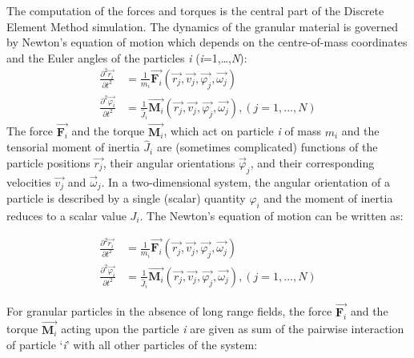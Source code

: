 The computation of the forces and torques is the central part of the Discrete 
Element Method 
simulation. 
The dynamics of the granular material is governed by Newton's equation of 
motion which depends on 
the centre-of-mass coordinates and the Euler angles of the particles 
\textit{i} 
(\textit{i}=1,\dots,\textit{N}):
\begin{align} 
\frac{{{\partial}^2}{\overrightarrow{r_i}}}{\partial{t^2}} 
&=\frac{1}{m_i}\overrightarrow{{\mathbf{F}}_{i}}(\overrightarrow{r_j},\overrightarrow{v_j},
 \overrightarrow{\varphi_j},\overrightarrow{\omega_j})
 \nonumber \\ 
\frac{{\partial^2}{\overrightarrow{\varphi_i}}}{\partial{t^2}}&=\frac{1}{{\hat{J}}_i}\overrightarrow{\mathbf{M}_i}(\overrightarrow{r_j},\overrightarrow{v_j},\overrightarrow{\varphi_j},
   \overrightarrow{\omega_j}), (j=1,...,N) \nonumber
\end{align}
The force $\overrightarrow{\mathbf{F}_{i}}$ and the torque 
$\overrightarrow{\mathbf{M}_{i}}$, 
which 
act on particle \textit{i} of mass $\mathit{m}_{\mathit{i}}$ and the tensorial 
moment of inertia 
${\hat{J}_i}$ are (sometimes complicated) functions of the particle 
positions 
$\overrightarrow{\mathit{r}_{\mathit{j}}}$, their angular orientations 
$\overrightarrow{\varphi}_{\mathit{j}}$, and their corresponding velocities 
$\overrightarrow{\mathit{v}_{\mathit{j}}}$ and 
$\overrightarrow{\omega}_{\mathit{j}}$. In a two-dimensional system, the 
angular 
orientation of a particle is described by a single (scalar) quantity 
$\varphi_{i}$ and the moment 
of inertia reduces to a scalar value $\mathit{J}_{i}$. The Newton's equation 
of motion can be written as:

\begin{align} 
	\frac{{{\partial}^2}{\overrightarrow{r_i}}}{\partial{t^2}} 
	&=\frac{1}{m_i}\overrightarrow{{\mathbf{F}}_{i}}(\overrightarrow{r_j},\overrightarrow{v_j},
	\overrightarrow{\varphi_j},\overrightarrow{\omega_j})
	\nonumber \\ 
	\frac{{\partial^2}{\overrightarrow{\varphi_i}}}{\partial{t^2}}&=\frac{1}{{\hat{J}}_i}\overrightarrow{\mathbf{M}_i}(\overrightarrow{r_j},\overrightarrow{v_j},\overrightarrow{\varphi_j},
	\overrightarrow{\omega_j}), (j=1,...,N) \nonumber
\end{align}

 For granular particles in the absence of long range fields, the force 
 $\overrightarrow{\mathbf{F}_{i}}$ and the torque 
 $\overrightarrow{\mathbf{M}_{i}}$ acting upon 
the 
 particle \textit{i} are given as sum of the pairwise interaction of particle 
 `\textit{i}' with 
all 
 other particles of the system:

